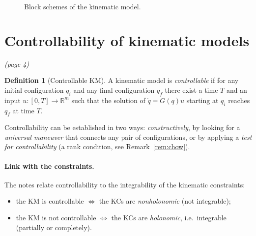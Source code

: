 \documentclass[11pt,a4paper]{article}
\newcommand{\R}{\mathbb{R}}
\newcommand{\dq}{\dot q}
\theoremstyle{definition}
\newtheorem{definition}[theorem]{Definition}
\begin{document}
\begin{figure}[h]
\centering
{}
\caption{Block schemes of the kinematic model.}
\end{figure}

\section{Controllability of kinematic models}\emph{(page 4)}

\begin{definition}[Controllable KM]
A kinematic model is \emph{controllable} if for any initial configuration $q_i$ and any final configuration $q_f$ there exist a time $T$ and an input $u:[0,T]\to\R^m$ such that the solution of $\dq=G(q)u$ starting at $q_i$ reaches $q_f$ at time $T$.
\end{definition}

Controllability can be established in two ways: \emph{constructively}, by looking for a \emph{universal maneuver} that connects any pair of configurations, or by applying a \emph{test for controllability} (a rank condition, see Remark~\ref{rem:chow}).

\paragraph{Link with the constraints.} The notes relate controllability to the integrability of the kinematic constraints:
\begin{itemize}[nosep]
\item the KM is controllable $\iff$ the KCs are \emph{nonholonomic} (not integrable);
\item the KM is not controllable $\iff$ the KCs are \emph{holonomic}, i.e.\ integrable (partially or completely).
\end{itemize}
\end{document}
